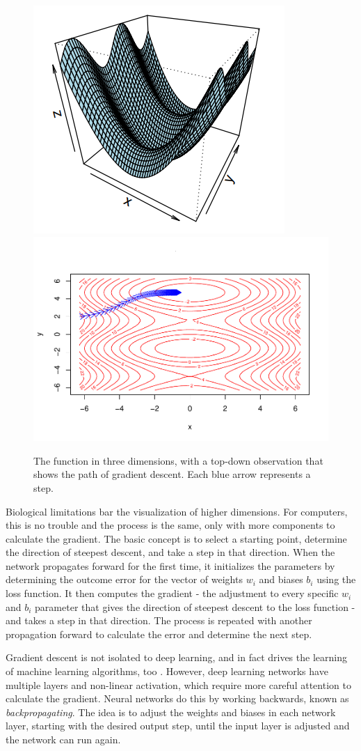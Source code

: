 \begin{figure}[H]
    \vspace{-12pt}
    \includegraphics[width = .4\textwidth]{Figures/grad_desc-51.png}
    \includegraphics[width = .6\textwidth]{Figures/grad_desc-50.pdf}
    \caption{\footnotesize The function in three dimensions, with a top-down observation that shows the path of gradient descent.  Each blue arrow represents a step.}
    \label{grad}
    \vspace{-10pt}
\end{figure}


Biological limitations bar the visualization of higher dimensions.  For computers, this is no trouble and the process is the same, only with more components to calculate the gradient.  The basic concept is to select a starting point, determine the direction of steepest descent, and take a step in that direction.  When the network propagates forward for the first time, it initializes the parameters by determining the outcome error for the vector of weights $w_i$ and biases $b_i$ using the loss function.  It then computes the gradient - the adjustment to every specific $w_i$ and $b_i$ parameter that gives the direction of steepest descent to the loss function - and takes a step in that direction.  The process is repeated with another propagation forward to calculate the error and determine the next step.

Gradient descent is not isolated to deep learning, and in fact drives the learning of machine learning algorithms, too \cite{Goodfellow-et-al-2016}.  However, deep learning networks have multiple layers and non-linear activation, which require more careful attention to calculate the gradient.  Neural networks do this by working backwards, known as \textit{backpropagating}.  The idea is to adjust the weights and biases in each network layer, starting with the desired output step, until the input layer is adjusted and the network can run again.

